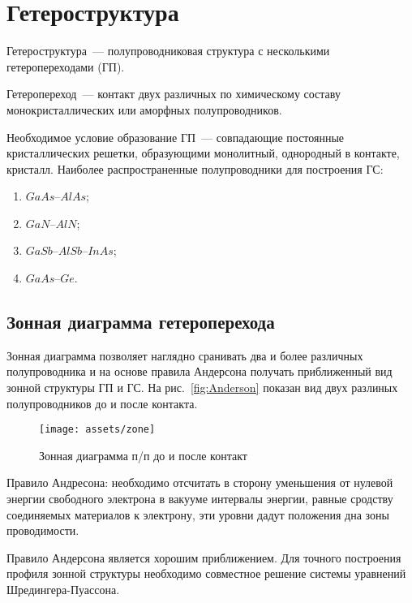 \section{Гетероструктура}
Гетероструктура~--- полупроводниковая структура с несколькими гетеропереходами (ГП). 


Гетеропереход~--- контакт двух различных по химическому составу монокристаллических или аморфных полупроводников.

Необходимое условие образование ГП~--- совпадающие постоянные кристаллических решетки, образующими монолитный, однородный в контакте, кристалл.
Наиболее распространенные полупроводники для построения ГС:
\begin{enumerate}
  \item $GaAs$--$AlAs$;
  \item $GaN$--$AlN$;
  \item $GaSb$--$AlSb$--$InAs$;
  \item $GaAs$--$Ge$.
\end{enumerate}

\subsection{Зонная диаграмма гетероперехода}
Зонная диаграмма позволяет наглядно сранивать два и более различных полупроводника и на основе правила Андерсона получать приближенный вид зонной структуры ГП и ГС. На рис.~\ref{fig:Anderson} показан вид двух разлиных полупроводников до и после контакта.

\begin{figure}[h]
	\centering
	\texttt{[image: assets/zone]}
	\caption{Зонная диаграмма п/п до и после контакт}
	\label{fig:zone}
\end{figure}

Правило Андресона: необходимо отсчитать в сторону уменьшения от нулевой энергии свободного электрона в вакууме интервалы энергии, равные сродству соединяемых материалов к электрону, эти уровни дадут положения дна зоны проводимости.

Правило Андерсона является хорошим приближением. Для точного построения профиля зонной структуры необходимо совместное решение системы уравнений Шредингера-Пуассона.


